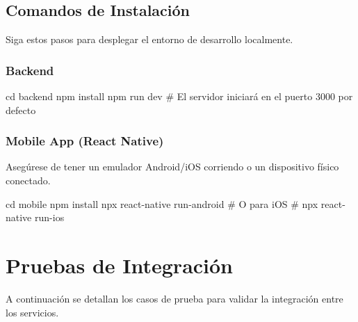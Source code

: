 \documentclass[
  letterpaper,
  DIV=11,
  numbers=noendperiod]{scrartcl}
\newenvironment{Shaded}{\begin{snugshade}}{\end{snugshade}}
\newcommand{\BuiltInTok}[1]{\textcolor[rgb]{0.00,0.23,0.31}{#1}}
\newcommand{\CommentTok}[1]{\textcolor[rgb]{0.37,0.37,0.37}{#1}}
\newcommand{\ExtensionTok}[1]{\textcolor[rgb]{0.00,0.23,0.31}{#1}}
\newcommand{\NormalTok}[1]{\textcolor[rgb]{0.00,0.23,0.31}{#1}}
\begin{document}
\subsection{Comandos de Instalación}\label{comandos-de-instalaciuxf3n}

Siga estos pasos para desplegar el entorno de desarrollo localmente.

\subsubsection{Backend}\label{backend}

\begin{Shaded}
\begin{Highlighting}[]
\BuiltInTok{cd}\NormalTok{ backend}
\ExtensionTok{npm}\NormalTok{ install}
\ExtensionTok{npm}\NormalTok{ run dev}
\CommentTok{\# El servidor iniciará en el puerto 3000 por defecto}
\end{Highlighting}
\end{Shaded}

\subsubsection{Mobile App (React Native)}\label{mobile-app-react-native}

Asegúrese de tener un emulador Android/iOS corriendo o un dispositivo
físico conectado.

\begin{Shaded}
\begin{Highlighting}[]
\BuiltInTok{cd}\NormalTok{ mobile}
\ExtensionTok{npm}\NormalTok{ install}
\ExtensionTok{npx}\NormalTok{ react{-}native run{-}android}
\CommentTok{\# O para iOS}
\CommentTok{\# npx react{-}native run{-}ios}
\end{Highlighting}
\end{Shaded}

\section{Pruebas de Integración}\label{pruebas-de-integraciuxf3n}

A continuación se detallan los casos de prueba para validar la
integración entre los servicios.
\end{document}
